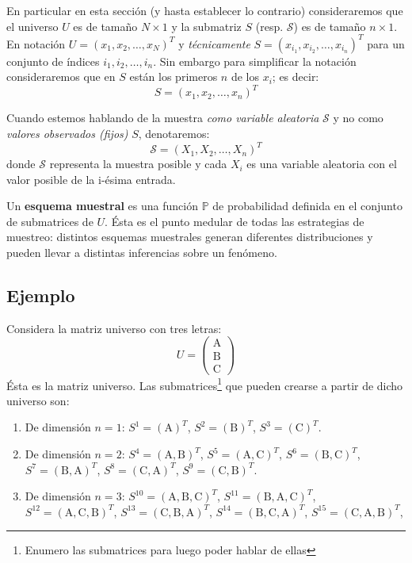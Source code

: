 \documentclass[
]{book}
\begin{document}
En particular en esta sección (y hasta establecer lo contrario) consideraremos que el universo \(U\) es de tamaño \(N \times 1\) y la submatriz \(S\) (resp. \(\mathcal{S}\)) es de tamaño \(n \times 1\). En notación \(U = (x_1, x_2, \dots, x_N)^T\) y \emph{técnicamente} \(S = (x_{i_1}, x_{i_2}, \dots, x_{i_n})^T\) para un conjunto de índices \(i_1, i_2, \dots, i_n\). Sin embargo para simplificar la notación consideraremos que en \(S\) están los primeros \(n\) de los \(x_i\); es decir:
\[
S = (x_1, x_2, \dots, x_n)^T
\]

Cuando estemos hablando de la muestra \emph{como variable aleatoria} \(\mathcal{S}\) y no como \emph{valores observados (fijos)} \(S\), denotaremos:
\[
\mathcal{S} = (X_1, X_2, \dots, X_n)^T
\]
donde \(\mathcal{S}\) representa la muestra posible y cada \(X_i\) es una variable aleatoria con el valor posible de la i-ésima entrada.

Un \textbf{esquema muestral} es una función \(\mathbb{P}\) de probabilidad definida en el conjunto de submatrices de \(U\). Ésta es el punto medular de todas las estrategias de muestreo: distintos esquemas muestrales generan diferentes distribuciones y pueden llevar a distintas inferencias sobre un fenómeno.

\hypertarget{ejemplo}{%
\subsection{Ejemplo}\label{ejemplo}}

Considera la matriz universo con tres letras:
\[
U = \begin{pmatrix}
\text{A} \\
\text{B} \\
\text{C} 
\end{pmatrix}
\]
Ésta es la matriz universo. Las submatrices\footnote{Enumero las submatrices para luego poder hablar de ellas} que pueden crearse a partir de dicho universo son:

\begin{enumerate}
\def\labelenumi{\arabic{enumi}.}
\item
  De dimensión \(n = 1\): \(S^1 = (\text{A})^T\), \(S^2 = (\text{B})^T\), \(S^3 = (\text{C})^T\).
\item
  De dimensión \(n = 2\): \(S^4 = (\text{A}, \text{B})^T\), \(S^5 = (\text{A}, \text{C})^T\), \(S^6 = (\text{B}, \text{C})^T\), \(S^7 = (\text{B}, \text{A})^T\), \(S^8 = (\text{C}, \text{A})^T\), \(S^9 = (\text{C}, \text{B})^T\).
\item
  De dimensión \(n = 3\): \(S^{10} = (\text{A}, \text{B}, \text{C})^T\), \(S^{11} = (\text{B}, \text{A}, \text{C})^T\), \(S^{12} = (\text{A}, \text{C}, \text{B})^T\), \(S^{13} = (\text{C}, \text{B}, \text{A})^T\), \(S^{14} = (\text{B}, \text{C}, \text{A})^T\), \(S^{15} = (\text{C}, \text{A}, \text{B})^T\),
\end{enumerate}
\end{document}
